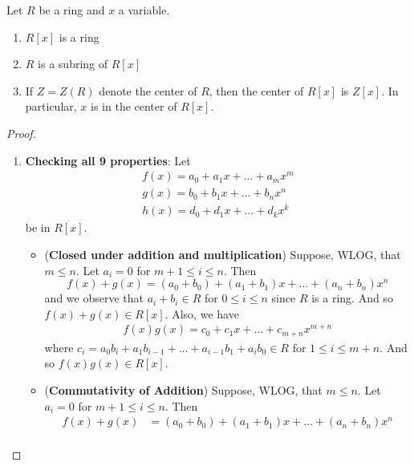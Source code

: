 \begin{propo}
\label{propo:ring_is_a_subring_of_its_polynomial_ring}
  Let $R$ be a ring and $x$ a variable.
  \begin{enumerate}
    \item $R[x]$ is a ring
    \item $R$ is a subring of $R[x]$
    \item If $Z = Z(R)$ denote the center of $R$, then the center of $R[x]$ is $Z[x]$. In particular, $x$ is in the center of $R[x]$.
  \end{enumerate}
\end{propo}

\begin{proof}
  \begin{enumerate}
    \item \textbf{Checking all 9 properties}: Let 
          \begin{gather*}
            f(x) = a_0 + a_1 x + \hdots + a_m x^m \\
            g(x) = b_0 + b_1 x + \hdots + b_n x^n \\
            h(x) = d_0 + d_1 x + \hdots + d_k x^k
          \end{gather*}
          be in $R[x]$.
      \begin{itemize}
        \item (\textbf{Closed under addition and multiplication})
          Suppose, WLOG, that $m \leq n$. Let $a_i = 0$ for $m + 1 \leq i \leq n$. Then
          \begin{equation*}
            f(x) + g(x) = (a_0 + b_0) + (a_1 + b_1) x + \hdots + (a_n + b_n) x^n
          \end{equation*}
          and we observe that $a_i + b_i \in R$ for $0 \leq i \leq n$ since $R$ is a ring. And so $f(x) + g(x) \in R[x]$. Also, we have
          \begin{align*}
            f(x) g(x) = c_0 + c_1 x + \hdots + c_{m + n} x^{m + n}
          \end{align*}
          where $c_i = a_0 b_i + a_1 b_{i - 1} + \hdots + a_{i - 1} b_1 + a_i b_0 \in R$ for $1 \leq i \leq m + n$. And so $f(x) g(x) \in R[x]$.
        \item (\textbf{Commutativity of Addition}) Suppose, WLOG, that $m \leq n$. Let $a_i = 0$ for $m + 1 \leq i \leq n$. Then
          \begin{align*}
            f(x) + g(x) &= (a_0 + b_0) + (a_1 + b_1) x + \hdots + (a_n + b_n) x^n \\

\end{align*}
\end{itemize}
\end{enumerate}
\end{proof}
